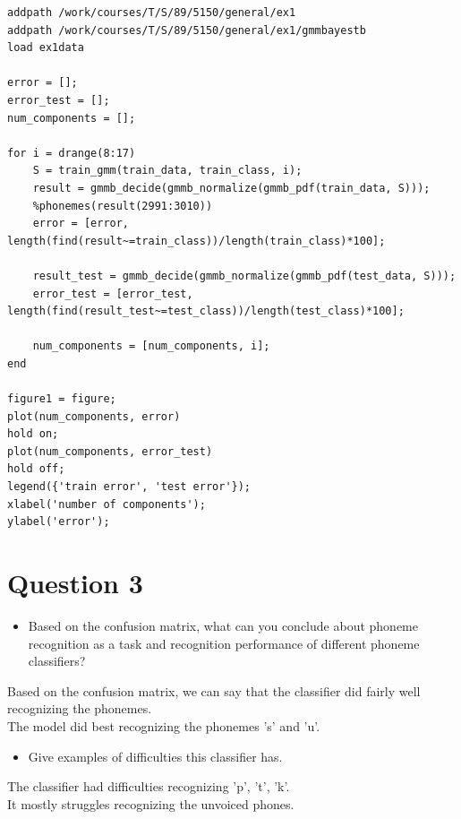 \documentclass[17pt]{article}
\begin{document}
\begin{lstlisting}
addpath /work/courses/T/S/89/5150/general/ex1
addpath /work/courses/T/S/89/5150/general/ex1/gmmbayestb
load ex1data

error = [];
error_test = [];
num_components = [];

for i = drange(8:17)
    S = train_gmm(train_data, train_class, i);
    result = gmmb_decide(gmmb_normalize(gmmb_pdf(train_data, S)));
    %phonemes(result(2991:3010))
    error = [error, length(find(result~=train_class))/length(train_class)*100];

    result_test = gmmb_decide(gmmb_normalize(gmmb_pdf(test_data, S)));
    error_test = [error_test, length(find(result_test~=test_class))/length(test_class)*100];
    
    num_components = [num_components, i];
end

figure1 = figure;
plot(num_components, error)
hold on;
plot(num_components, error_test)
hold off;
legend({'train error', 'test error'});
xlabel('number of components');
ylabel('error');
\end{lstlisting}


\section{Question 3}
\begin{itemize}
	\item{Based on the confusion matrix, what can you conclude about phoneme recognition as a task and recognition performance of different phoneme classifiers?
}
\end{itemize}
Based on the confusion matrix, we can say that the classifier did fairly
well recognizing the phonemes. \\
The model did best recognizing the phonemes 's' and 'u'.

\begin{itemize}
	\item{Give examples of difficulties this classifier has.}
\end{itemize}
The classifier had difficulties recognizing 'p', 't', 'k'. \\
It mostly struggles recognizing the unvoiced phones.
\end{document}
